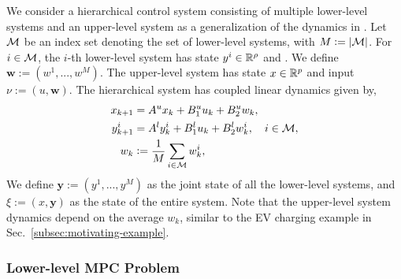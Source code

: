 We consider a hierarchical control system consisting of multiple lower-level systems and an upper-level system as a generalization of the dynamics in \cite{mintz2018control}.
Let $\mathcal{M}$ be an index set denoting the set of lower-level systems, with $M := |\mathcal{M}|$.
For $i \in \mathcal{M}$, the $i$-th lower-level system has state $y^i \in \mathbb{R}^\rho$ and %
.
We define $\bm{w} := (w^1, ..., w^{M})$.
The upper-level system has state $x \in \mathbb{R}^p$ and input $\nu := (u, \bm{w})$.
The hierarchical system has coupled linear dynamics given by,
\begin{equation}
\label{eq:coupled-dynamics}
\begin{split}
    x_{k+1} & = A^u x_k + B^u_1 u_k + B^u_2 w_k, \\
    y^i_{k+1} & = A^l y^i_k + B^l_1 u_k + B^l_2 w^i_k, \quad i \in \mathcal{M}, \\
    w_k & := \frac{1}{M} \sum_{i \in \mathcal{M}} w^i_k,
\end{split}
\end{equation}
We define $\bm{y} := (y^1, ..., y^{M})$ as the joint state of all the lower-level systems, and $\xi := (x, \bm{y})$ as the state of the entire system.
Note that the upper-level system dynamics depend on the average $w_k$, similar to the EV charging example in Sec.~\ref{subsec:motivating-example}.

\subsubsection{Lower-level MPC Problem}
\label{subsubsec:lower-level-mpc-problem}


